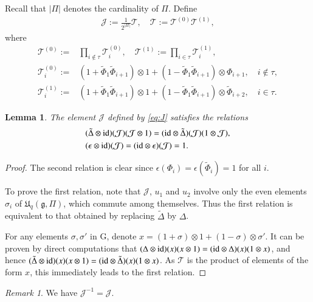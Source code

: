 \documentclass[12pt]{amsart}
\newtheorem{lemma}[theorem]{Lemma}
\theoremstyle{definition}
\theoremstyle{remark}
\newtheorem{remark}[theorem]{Remark}
\numberwithin{equation}{section}
\begin{document}
Recall that $|\Pi|$ denotes the cardinality of $\Pi$. Define
\begin{eqnarray}\label{eq:J}
{{\mathcal J}}:=\frac{1}{2^{|\Pi|}}{{\mathscr T}}, \quad {{\mathscr T}}:={{\mathscr T}}^{(0)}{{\mathscr T}}^{(1)},
\end{eqnarray}
where
\[
\begin{aligned}
{{\mathscr T}}^{(0)}:=&\prod_{i\notin\tau}{{\mathscr T}}^{(0)}_i, \quad {{\mathscr T}}^{(1)}:=\prod_{i\in\tau}{{\mathscr T}}^{(1)}_i, \\
{{\mathscr T}}^{(0)}_i:=&(1+\tilde{\Phi}_1\tilde{\Phi}_{i+1})\otimes 1+(1-\tilde{\Phi}_1\tilde{\Phi}_{i+1})\otimes \Phi_{i+1},\quad i\notin\tau, \\
{{\mathscr T}}^{(1)}_i:=&(1+\tilde{\Phi}_1\tilde{\Phi}_{i+1})\otimes 1+(1-\tilde{\Phi}_1\tilde{\Phi}_{i+1})\otimes \tilde{\Phi}_{i+2}, \quad i\in\tau.
\end{aligned}
\]
\begin{lemma}\label{lem:j-properties}
The element ${{\mathcal J}}$ defined by \eqref{eq:J} satisfies the relations
 \[
 \begin{aligned}
&(\tilde{\Delta}\otimes{{\rm{id}}})({{\mathcal J}})({{\mathcal J}}\otimes 1)=({{\rm{id}}}\otimes\tilde{\Delta})({{\mathcal J}})(1\otimes{{\mathcal J}}), \\
&(\epsilon\otimes{{\rm{id}}})({{\mathcal J}})=({{\rm{id}}}\otimes\epsilon)({{\mathcal J}})=1.
\end{aligned}
\]
\end{lemma}
\begin{proof}
The second relation is clear since $\epsilon(\Phi_i)=\epsilon(\tilde\Phi_i)=1$ for all $i$.

To prove the first relation, note that ${{\mathcal J}}$, $u_1$ and $u_2$ involve only the even elements $\sigma_i$ of ${{\mathfrak U}}_q({{\mathfrak g}}, \Pi)$, which commute  among themselves.
Thus the first relation is equivalent to that obtained by replacing $\tilde{\Delta}$ by $\Delta$.

For any elements $\sigma,\sigma'$ in $\mathrm{G}$, denote $x=(1+\sigma)\otimes 1+(1-\sigma)\otimes \sigma'$. It can be proven by direct computations that
$(\Delta\otimes{{\rm{id}}})(x)(x\otimes 1)=({{\rm{id}}}\otimes\Delta)(x)(1\otimes x)$, and hence $(\tilde{\Delta}\otimes{{\rm{id}}})(x)(x\otimes 1)=({{\rm{id}}}\otimes\tilde{\Delta})(x)(1\otimes x)$. As ${{\mathscr T}}$ is the product of elements of the form $x$, this immediately leads to the first relation.
\end{proof}
\begin{remark}
We have ${{\mathcal J}}^{-1}={{\mathcal J}}$.
\end{remark}
\end{document}
